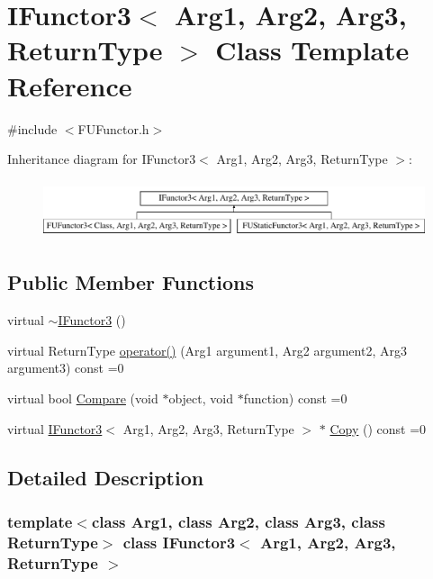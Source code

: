 \hypertarget{classIFunctor3}{
\section{IFunctor3$<$ Arg1, Arg2, Arg3, ReturnType $>$ Class Template Reference}
\label{classIFunctor3}
}


{\ttfamily \#include $<$FUFunctor.h$>$}

Inheritance diagram for IFunctor3$<$ Arg1, Arg2, Arg3, ReturnType $>$:\begin{figure}[H]
\begin{center}
\leavevmode
\includegraphics[height=1.712538cm]{classIFunctor3}
\end{center}
\end{figure}
\subsection*{Public Member Functions}
\begin{DoxyCompactItemize}
\item 
virtual \hyperlink{classIFunctor3_a286a0df5ddb60b8c8fc7adf9611d6cfd}{$\sim$IFunctor3} ()
\item 
virtual ReturnType \hyperlink{classIFunctor3_a294e3f74b40e43701a0d0f1369ab7505}{operator()} (Arg1 argument1, Arg2 argument2, Arg3 argument3) const =0
\item 
virtual bool \hyperlink{classIFunctor3_afebcf117388c3c5e47bbc7f910400e03}{Compare} (void $\ast$object, void $\ast$function) const =0
\item 
virtual \hyperlink{classIFunctor3}{IFunctor3}$<$ Arg1, Arg2, Arg3, ReturnType $>$ $\ast$ \hyperlink{classIFunctor3_acfb39c190343a3c521d349302c0e71d1}{Copy} () const =0
\end{DoxyCompactItemize}


\subsection{Detailed Description}
\subsubsection*{template$<$class Arg1, class Arg2, class Arg3, class ReturnType$>$ class IFunctor3$<$ Arg1, Arg2, Arg3, ReturnType $>$}

